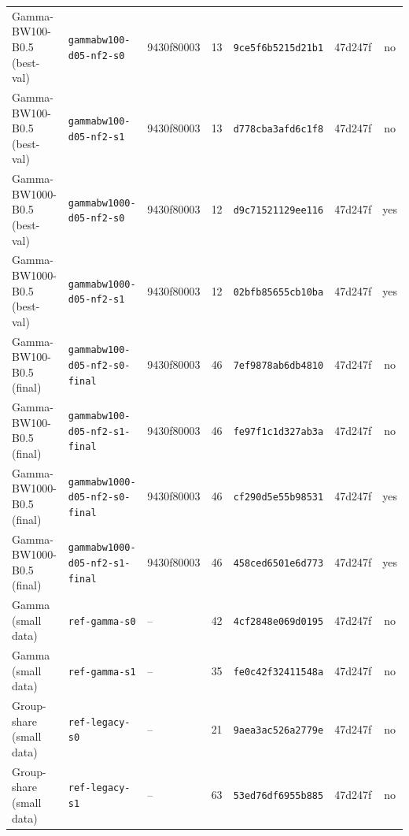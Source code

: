 \begin{tabular}{llllllc}
Gamma-BW100-B0.5 (best-val) & \texttt{gammabw100-d05-nf2-s0} & 9430f80003 & 13 & \texttt{9ce5f6b5215d21b1} & 47d247f & no \\
Gamma-BW100-B0.5 (best-val) & \texttt{gammabw100-d05-nf2-s1} & 9430f80003 & 13 & \texttt{d778cba3afd6c1f8} & 47d247f & no \\
Gamma-BW1000-B0.5 (best-val) & \texttt{gammabw1000-d05-nf2-s0} & 9430f80003 & 12 & \texttt{d9c71521129ee116} & 47d247f & yes \\
Gamma-BW1000-B0.5 (best-val) & \texttt{gammabw1000-d05-nf2-s1} & 9430f80003 & 12 & \texttt{02bfb85655cb10ba} & 47d247f & yes \\
Gamma-BW100-B0.5 (final) & \texttt{gammabw100-d05-nf2-s0-final} & 9430f80003 & 46 & \texttt{7ef9878ab6db4810} & 47d247f & no \\
Gamma-BW100-B0.5 (final) & \texttt{gammabw100-d05-nf2-s1-final} & 9430f80003 & 46 & \texttt{fe97f1c1d327ab3a} & 47d247f & no \\
Gamma-BW1000-B0.5 (final) & \texttt{gammabw1000-d05-nf2-s0-final} & 9430f80003 & 46 & \texttt{cf290d5e55b98531} & 47d247f & yes \\
Gamma-BW1000-B0.5 (final) & \texttt{gammabw1000-d05-nf2-s1-final} & 9430f80003 & 46 & \texttt{458ced6501e6d773} & 47d247f & yes \\
Gamma (small data) & \texttt{ref-gamma-s0} & -- & 42 & \texttt{4cf2848e069d0195} & 47d247f & no \\
Gamma (small data) & \texttt{ref-gamma-s1} & -- & 35 & \texttt{fe0c42f32411548a} & 47d247f & no \\
Group-share (small data) & \texttt{ref-legacy-s0} & -- & 21 & \texttt{9aea3ac526a2779e} & 47d247f & no \\
Group-share (small data) & \texttt{ref-legacy-s1} & -- & 63 & \texttt{53ed76df6955b885} & 47d247f & no \\
\bottomrule
\end{tabular}
